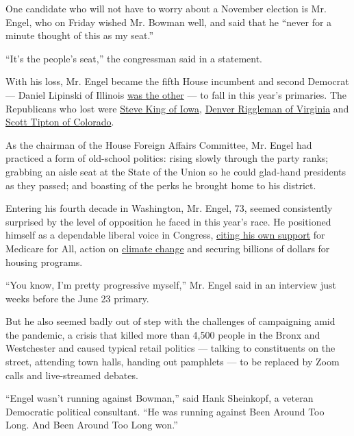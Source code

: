 One candidate who will not have to worry about a November election is
Mr. Engel, who on Friday wished Mr. Bowman well, and said that he
``never for a minute thought of this as my seat.''

``It's the people's seat,'' the congressman said in a statement.

With his loss, Mr. Engel became the fifth House incumbent and second
Democrat --- Daniel Lipinski of Illinois
\href{https://www.nytimes3xbfgragh.onion/2020/03/18/us/politics/marie-newman-dan-lipinski-illinois.html}{was
the other} --- to fall in this year's primaries. The Republicans who
lost were
\href{https://www.nytimes3xbfgragh.onion/2020/06/03/us/politics/steve-king-iowa-primary.html}{Steve
King of Iowa},
\href{https://www.nytimes3xbfgragh.onion/2020/06/14/us/politics/denver-riggleman-virginia-primary-bob-good.html}{Denver
Riggleman of Virginia} and
\href{https://www.nytimes3xbfgragh.onion/2020/06/30/us/lauren-boebert-colorado.html}{Scott
Tipton of Colorado}.

As the chairman of the House Foreign Affairs Committee, Mr. Engel had
practiced a form of old-school politics: rising slowly through the party
ranks; grabbing an aisle seat at the State of the Union so he could
glad-hand presidents as they passed; and boasting of the perks he
brought home to his district.

Entering his fourth decade in Washington, Mr. Engel, 73, seemed
consistently surprised by the level of opposition he faced in this
year's race. He positioned himself as a dependable liberal voice in
Congress,
\href{https://engelforcongress.com/priorities/healthcare/}{citing his
own support} for Medicare for All, action on
\href{https://engelforcongress.com/priorities/climate-change/}{climate
change} and securing billions of dollars for housing programs.

``You know, I'm pretty progressive myself,'' Mr. Engel said in an
interview just weeks before the June 23 primary.

But he also seemed badly out of step with the challenges of campaigning
amid the pandemic, a crisis that killed more than 4,500 people in the
Bronx and Westchester and caused typical retail politics --- talking to
constituents on the street, attending town halls, handing out pamphlets
--- to be replaced by Zoom calls and live-streamed debates.

``Engel wasn't running against Bowman,'' said Hank Sheinkopf, a veteran
Democratic political consultant. ``He was running against Been Around
Too Long. And Been Around Too Long won.''

